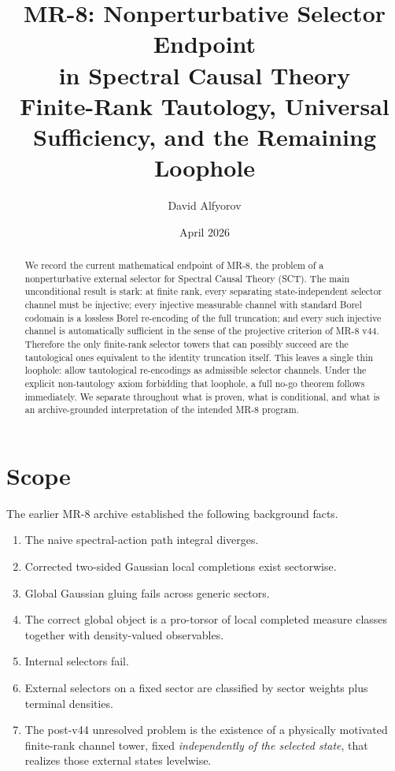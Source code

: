 \documentclass[11pt,a4paper]{article}
\title{%
  \textbf{MR-8: Nonperturbative Selector Endpoint}\\[4pt]
  \textbf{in Spectral Causal Theory}\\[8pt]
  \large Finite-Rank Tautology, Universal Sufficiency, and the Remaining Loophole
}
\author{David Alfyorov}
\date{April 2026}
\theoremstyle{definition}
\theoremstyle{remark}
\begin{document}
\maketitle

\begin{center}
\end{center}

\begin{abstract}
We record the current mathematical endpoint of MR-8, the problem of a
nonperturbative external selector for Spectral Causal Theory (SCT).  The
main unconditional result is stark: at finite rank, every separating
state-independent selector channel must be injective; every injective
measurable channel with standard Borel codomain is a lossless Borel
re-encoding of the full truncation; and every such injective channel is
automatically sufficient in the sense of the projective criterion of
MR-8 v44.  Therefore the only finite-rank selector towers that can
possibly succeed are the tautological ones equivalent to the identity
truncation itself.  This leaves a single thin loophole: allow
tautological re-encodings as admissible selector channels.  Under the
explicit non-tautology axiom forbidding that loophole, a full no-go
theorem follows immediately.  We separate throughout what is proven, what
is conditional, and what is an archive-grounded interpretation of the
intended MR-8 program.
\end{abstract}

\tableofcontents
\newpage

\section{Scope}

The earlier MR-8 archive established the following background facts.

\begin{enumerate}[leftmargin=2.2em]
  \item The naive spectral-action path integral diverges.
  \item Corrected two-sided Gaussian local completions exist sectorwise.
  \item Global Gaussian gluing fails across generic sectors.
  \item The correct global object is a pro-torsor of local completed
        measure classes together with density-valued observables.
  \item Internal selectors fail.
  \item External selectors on a fixed sector are classified by sector
        weights plus terminal densities.
  \item The post-v44 unresolved problem is the existence of a
        physically motivated finite-rank channel tower, fixed
        \emph{independently of the selected state}, that realizes those
        external states levelwise.
\end{enumerate}
\end{document}
